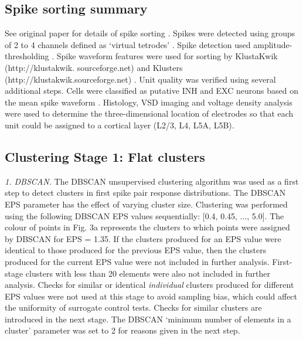 \documentclass{article}
\begin{document}
\subsection{Spike sorting summary}
\label{methods:spike_sorting}

See original paper for details of spike sorting \cite{reyes2014laminar}.
Spikes were detected using groups of 2 to 4 channels defined as `virtual tetrodes' \cite{harris2000accuracy, einevoll2012towards}. Spike detection used amplitude-thresholding \cite{gray1995tetrodes}. Spike waveform features were used for sorting by KlustaKwik (http://klustakwik. sourceforge.net) and Klusters (http://klustakwik.sourceforge.net) \cite{harris2000accuracy, hazan2006klusters}. Unit quality was verified using several additional steps. Cells were classified as putative INH and EXC neurons based on the mean spike waveform \cite{sirota2008entrainment, sakata2009laminar, royer2012control}. Histology, VSD imaging and voltage density analysis were used to determine the three-dimensional location of electrodes so that each unit could be assigned to a cortical layer (L2/3, L4, L5A, L5B).



\subsection{Clustering Stage 1: Flat clusters}

\label{methods:flat_clusters}

\textit{1. DBSCAN.} The DBSCAN unsupervised clustering algorithm was used as a first step to detect clusters in  first spike pair response distributions.
The DBSCAN EPS parameter has the effect of varying cluster size. Clustering was performed using the following DBSCAN EPS values sequentially: [0.4, 0.45, ..., 5.0]. The colour of points in Fig. 3a represents the clusters to which points were assigned by DBSCAN for EPS = 1.35. If the clusters produced for an EPS value were identical to those produced for the previous EPS value, then the clusters produced for the current EPS value were not included in further analysis. First-stage clusters with less than 20 elements were also not included in further analysis. Checks for similar or identical \textit{individual} clusters produced for different EPS values were not used at this stage to avoid sampling bias, which could affect the uniformity of surrogate control tests. Checks for similar clusters are introduced in the next stage. The DBSCAN `minimum number of elements in a cluster' parameter was set to 2 for reasons given in the next step.
\end{document}
